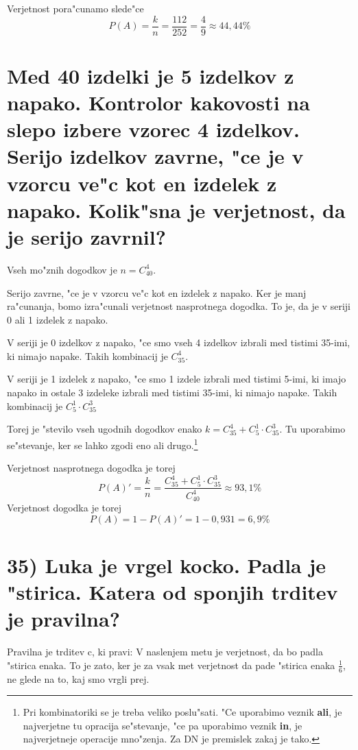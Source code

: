 \documentclass[a4paper, 12pt]{article}
\begin{document}
Verjetnost pora"cunamo slede"ce
\begin{equation*}
P(A) = \dfrac{k}{n} = \dfrac{112}{252} = \dfrac{4}{9} \approx 44,44\%
\end{equation*}

\section*{Med 40 izdelki je 5 izdelkov z napako. Kontrolor kakovosti na slepo izbere vzorec 4 izdelkov. Serijo izdelkov zavrne, "ce je v vzorcu ve"c kot en izdelek z napako. Kolik"sna je verjetnost, da je serijo zavrnil?}
Vseh mo"znih dogodkov je $n = C_{40}^4$.

Serijo zavrne, "ce je v vzorcu ve"c kot en izdelek z napako. Ker je manj ra"cunanja, bomo izra"cunali verjetnost nasprotnega dogodka. To je, da je v seriji 0 ali 1 izdelek z napako. 

V seriji je 0 izdelkov z napako, "ce smo vseh 4 izdelkov izbrali med tistimi 35-imi, ki nimajo napake. Takih kombinacij je $C_{35}^4$. 

V seriji je 1 izdelek z napako, "ce smo 1 izdele izbrali med tistimi 5-imi, ki imajo napako in ostale 3 izdeleke izbrali med tistimi 35-imi, ki nimajo napake. Takih kombinacij je $C_5^1 \cdot C_{35}^3$

Torej je "stevilo vseh ugodnih dogodkov enako $k = C_{35}^4 + C_5^1 \cdot C_{35}^3$. Tu uporabimo se"stevanje, ker se lahko zgodi eno ali drugo.\footnote{Pri kombinatoriki se je treba veliko poslu"sati. "Ce uporabimo veznik \textbf{ali}, je najverjetne tu opracija se"stevanje, "ce pa uporabimo veznik \textbf{in}, je najverjetneje operacije mno"zenja. Za DN je premislek zakaj je tako.}

Verjetnost nasprotnega dogodka je torej
\begin{equation*}
P(A)' = \dfrac{k}{n} = \dfrac{C_{35}^4 + C_5^1 \cdot C_{35}^3}{C_{40}^4} \approx 93,1\%
\end{equation*}
Verjetnost dogodka je torej
\begin{equation*}
P(A) = 1 - P(A)' = 1 - 0,931 = 6,9\%
\end{equation*}

\section*{35) Luka je vrgel kocko. Padla je "stirica. Katera od sponjih trditev je pravilna?}
Pravilna je trditev c, ki pravi: V naslenjem metu je verjetnost, da bo padla "stirica enaka. To je zato, ker je za vsak met verjetnost da pade "stirica enaka $\frac{1}{6}$, ne glede na to, kaj smo vrgli prej.
\end{document}
